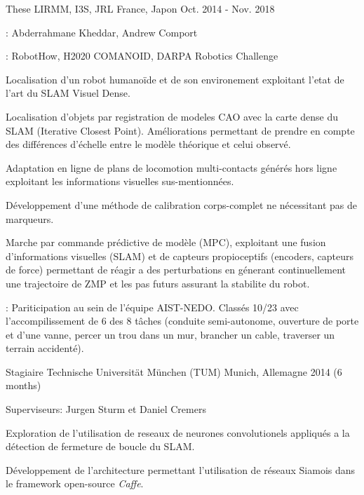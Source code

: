 \begin{cventries}
  \cventry
    {These} %
    {LIRMM, I3S, JRL} %
    {France, Japon} %
    {Oct. 2014 - Nov. 2018} %
    {
      \begin{cvitems} %
        \item {}: Abderrahmane Kheddar, Andrew Comport 
        \item {}: RobotHow, H2020 COMANOID, DARPA Robotics Challenge
        \item Localisation d'un robot humanoïde et de son environement exploitant l'etat de l'art du SLAM Visuel Dense.
        \item Localisation d'objets par registration de modeles CAO avec la carte dense du SLAM (Iterative Closest Point). Améliorations permettant de prendre en compte des différences d'échelle entre le modèle théorique et celui observé.
        \item Adaptation en ligne de plans de locomotion multi-contacts générés hors ligne exploitant les informations visuelles sus-mentionnées. 
        \item Développement d'une méthode de calibration corps-complet ne nécessitant pas de marqueurs.
        \item Marche par commande prédictive de modèle (MPC), exploitant une fusion d'informations visuelles (SLAM) et de capteurs propioceptifs (encoders, capteurs de force) permettant de réagir a des perturbations en génerant continuellement une trajectoire de ZMP et les pas futurs assurant la stabilite du robot.
        \item {}: Pariticipation au sein de l'équipe AIST-NEDO. Classés 10/23 avec l'accompilissement de 6 des 8 tâches (conduite semi-autonome, ouverture de porte et d'une vanne, percer un trou dans un mur, brancher un cable, traverser un terrain accidenté).
      \end{cvitems}
    }

  \cventry
    {Stagiaire} %
    {Technische Universität München (TUM)} %
    {Munich, Allemagne} %
    {2014 (6 months)} %
    {
      \begin{cvitems} %
        \item Superviseurs: Jurgen Sturm et Daniel Cremers
        \item Exploration de l'utilisation de reseaux de neurones convolutionels appliqués a la détection de fermeture de boucle du SLAM.
        \item Développement de l'architecture permettant l'utilisation de réseaux Siamois dans le framework open-source \emph{Caffe}.
      \end{cvitems}
    }


\end{cventries}
